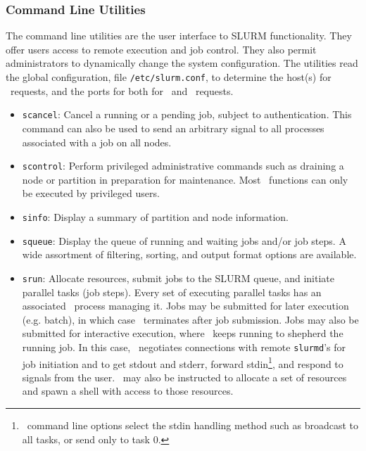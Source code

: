 \subsubsection{Command Line Utilities}

The command line utilities are the user interface to SLURM functionality.
They offer users access to remote execution and job control. They also 
permit administrators to dynamically change the system configuration. The 
utilities read the global configuration, file {\tt /etc/slurm.conf}, 
to determine the host(s) for \slurmctld\ requests, and the ports for 
both for \slurmctld\ and \slurmd\ requests. 

\begin{itemize}
\item {\tt scancel}: Cancel a running or a pending job, subject to
authentication. This command can also be used to send an arbitrary 
signal to all processes associated with a job on all nodes.

\item {\tt scontrol}: Perform privileged administrative commands
such as draining a node or partition in preparation for maintenance. 
Most \scontrol\ functions can only be executed by privileged users.

\item {\tt sinfo}: Display a summary of partition and node information.

\item {\tt squeue}: Display the queue of running and waiting jobs 
and/or job steps. A wide assortment of filtering, sorting, and output 
format options are available.

\item {\tt srun}: Allocate resources, submit jobs to the SLURM queue,
and initiate parallel tasks (job steps). 
Every set of executing parallel tasks has an associated \srun\ process managing it. 
Jobs may be submitted for later execution (e.g. batch), in which case 
\srun\ terminates after job submission. 
Jobs may also be submitted for interactive execution, where \srun\ keeps 
running to shepherd the running job. In this case, 
\srun\ negotiates connections with remote {\tt slurmd}'s 
for job initiation and to
get stdout and stderr, forward stdin\footnote{\srun\ command
line options select the stdin handling method such as broadcast to all
tasks, or send only to task 0.}, and respond to signals from the user.
\srun\ may also be instructed to allocate a set of resources and
spawn a shell with access to those resources.

\end{itemize}

